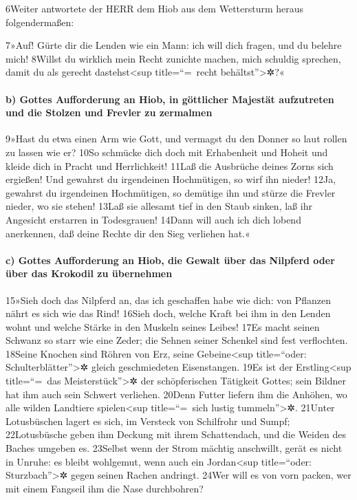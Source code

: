 6Weiter antwortete der HERR dem Hiob aus dem Wettersturm heraus
folgendermaßen:

7»Auf! Gürte dir die Lenden wie ein Mann: ich will dich fragen, und du
belehre mich! 8Willst du wirklich mein Recht zunichte machen, mich
schuldig sprechen, damit du als gerecht dastehst\textless sup
title=``=~recht behältst''\textgreater✲?«

\hypertarget{b-gottes-aufforderung-an-hiob-in-guxf6ttlicher-majestuxe4t-aufzutreten-und-die-stolzen-und-frevler-zu-zermalmen}{%
\paragraph{b) Gottes Aufforderung an Hiob, in göttlicher Majestät
aufzutreten und die Stolzen und Frevler zu
zermalmen}\label{b-gottes-aufforderung-an-hiob-in-guxf6ttlicher-majestuxe4t-aufzutreten-und-die-stolzen-und-frevler-zu-zermalmen}}

9»Hast du etwa einen Arm wie Gott, und vermagst du den Donner so laut
rollen zu lassen wie er? 10So schmücke dich doch mit Erhabenheit und
Hoheit und kleide dich in Pracht und Herrlichkeit! 11Laß die Ausbrüche
deines Zorns sich ergießen! Und gewahrst du irgendeinen Hochmütigen, so
wirf ihn nieder! 12Ja, gewahrst du irgendeinen Hochmütigen, so demütige
ihn und stürze die Frevler nieder, wo sie stehen! 13Laß sie allesamt
tief in den Staub sinken, laß ihr Angesicht erstarren in Todesgrauen!
14Dann will auch ich dich lobend anerkennen, daß deine Rechte dir den
Sieg verliehen hat.«

\hypertarget{c-gottes-aufforderung-an-hiob-die-gewalt-uxfcber-das-nilpferd-oder-uxfcber-das-krokodil-zu-uxfcbernehmen}{%
\paragraph{c) Gottes Aufforderung an Hiob, die Gewalt über das Nilpferd
oder über das Krokodil zu
übernehmen}\label{c-gottes-aufforderung-an-hiob-die-gewalt-uxfcber-das-nilpferd-oder-uxfcber-das-krokodil-zu-uxfcbernehmen}}

15»Sieh doch das Nilpferd an, das ich geschaffen habe wie dich: von
Pflanzen nährt es sich wie das Rind! 16Sieh doch, welche Kraft bei ihm
in den Lenden wohnt und welche Stärke in den Muskeln seines Leibes! 17Es
macht seinen Schwanz so starr wie eine Zeder; die Sehnen seiner Schenkel
sind fest verflochten. 18Seine Knochen sind Röhren von Erz, seine
Gebeine\textless sup title=``oder: Schulterblätter''\textgreater✲ gleich
geschmiedeten Eisenstangen. 19Es ist der Erstling\textless sup
title=``=~das Meisterstück''\textgreater✲ der schöpferischen Tätigkeit
Gottes; sein Bildner hat ihm auch sein Schwert verliehen. 20Denn Futter
liefern ihm die Anhöhen, wo alle wilden Landtiere spielen\textless sup
title=``=~sich lustig tummeln''\textgreater✲. 21Unter Lotusbüschen
lagert es sich, im Versteck von Schilfrohr und Sumpf; 22Lotusbüsche
geben ihm Deckung mit ihrem Schattendach, und die Weiden des Baches
umgeben es. 23Selbst wenn der Strom mächtig anschwillt, gerät es nicht
in Unruhe: es bleibt wohlgemut, wenn auch ein Jordan\textless sup
title=``oder: Sturzbach''\textgreater✲ gegen seinen Rachen andringt.
24Wer will es von vorn packen, wer mit einem Fangseil ihm die Nase
durchbohren?

